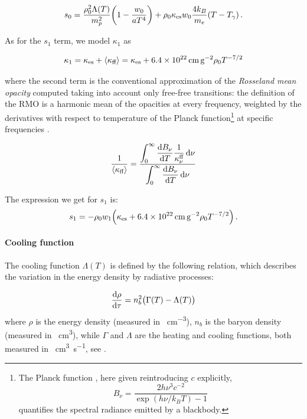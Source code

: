 \documentclass[main.tex]{subfiles}
\begin{document}
\begin{equation}
    s_0 = \frac{\rho_0^2 \Lambda (T)}{m_p^2} \qty(1 - \frac{w_0}{aT^4}) + \rho_0 \kappa_{\text{es}} w_0 \frac{4 k_B}{m_e} (T - T_\gamma)\,.
\end{equation}

As for the \(s_1\) term, we model \(\kappa_1\) as

\begin{equation}
  \kappa_1 = \kappa_{\text{es}} + \expval{\kappa_{\text{ff}}}
  = \kappa_{\text{es}} + \SI{6.4e22}{\centi\metre\square\per\gram} \rho_0 T^{-7/2}
\end{equation}

where the second term is the conventional approximation of the \emph{Rosseland mean opacity} computed taking into account only free-free transitions: the definition of the RMO is a harmonic mean of the opacities at every frequency, weighted by the derivatives with respect to temperature of the Planck function\footnote{The Planck function \cite[eq. 1.51]{RybickiLightman:2004}, here given reintroducing \(c\) explicitly,
\[
B_\nu = \frac{2h \nu^3 c^{-2}}{\exp(h\nu / k_B T) - 1}
\]
quantifies the spectral radiance emitted by a blackbody.
}
at specific frequencies \cite[eq. 1.110]{RybickiLightman:2004}.

\begin{equation}
  \frac{1}{\expval{\kappa_{\text{ff}}}} =
  \frac{ \displaystyle\int _{0}   ^{\infty}  \dv{B_\nu}{T} \frac{1}{\kappa_\nu^{\text{ff}}} \dd{\nu}}
  {  \displaystyle \int _{0}   ^{\infty} \dv{B_\nu}{T} \dd{\nu}}
\end{equation}

The expression we get for \(s_1\) is:
\begin{equation}
  s_1 = - \rho_0 w_1 \qty(\kappa_{\text{es}} + \SI{6.4e22}{\centi\metre\square\per\gram} \rho_0 T^{-7/2}) \,.
\end{equation}

\paragraph{Cooling function}

The cooling function \(\Lambda (T)\) is defined by the following relation, which describes the variation in the energy density by radiative processes:

\begin{equation}
    \dv{\rho}{\tau} = n^2_b \qty(\Gamma(T) - \Lambda (T))
\end{equation}
where \(\rho\) is the energy density (measured in \si{\erg\per\cubic\centi\metre}), \(n_b\) is the baryon density (measured in \si{\per\cubic\centi\metre}), while \(\Gamma\) and \(\Lambda\) are the heating and cooling functions, both measured in \si{\erg\cubic\centi\metre\per\second}, see \cite[equation 1]{GnedinHollon:2012}.
\end{document}

